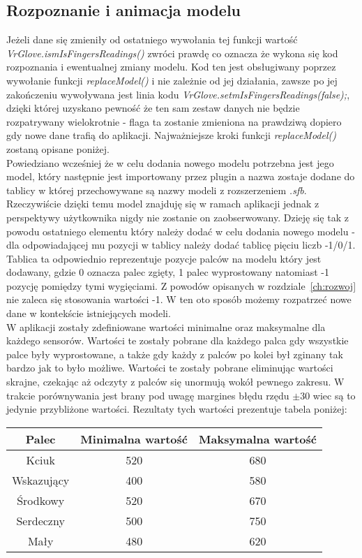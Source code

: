 	\subsection{Rozpoznanie i animacja modelu}
	\label{subsec:rozpoznanie}
	Jeżeli dane się zmieniły od ostatniego wywołania tej funkcji wartość \\  \textit{VrGlove.ismIsFingersReadings()} zwróci prawdę co oznacza że wykona się kod rozpoznania i ewentualnej zmiany modelu. Kod ten jest obsługiwany poprzez wywołanie funkcji \textit{replaceModel()} i nie zależnie od jej działania, zawsze po jej zakończeniu wywoływana jest linia kodu \textit{VrGlove.setmIsFingersReadings(false);}, dzięki której uzyskano pewność że ten sam zestaw danych nie będzie rozpatrywany wielokrotnie -  flaga ta zostanie zmieniona na prawdziwą dopiero gdy nowe dane trafią do aplikacji. Najważniejsze kroki funkcji \textit{replaceModel()} zostaną opisane poniżej. \\
	Powiedziano wcześniej że w celu dodania nowego modelu potrzebna jest jego model, który następnie jest importowany przez plugin a nazwa zostaje dodane do tablicy w której przechowywane są nazwy modeli z rozszerzeniem \textit{.sfb}. Rzeczywiście dzięki temu model znajduję się w ramach aplikacji jednak z perspektywy użytkownika nigdy nie zostanie on zaobserwowany. Dzieję się tak z powodu ostatniego elementu który należy dodać w celu dodania nowego modelu - dla odpowiadającej mu pozycji w tablicy należy dodać tablicę pięciu liczb -1/0/1. Tablica ta odpowiednio reprezentuje pozycje palców na modelu który jest dodawany, gdzie 0 oznacza palec zgięty, 1 palec wyprostowany natomiast -1 pozycję pomiędzy tymi wygięciami. Z powodów opisanych w rozdziale~\ref{ch:rozwoj} nie zaleca się stosowania wartości -1. W ten oto sposób możemy rozpatrzeć nowe dane w kontekście istniejących modeli. \\
	W aplikacji zostały zdefiniowane wartości minimalne oraz maksymalne dla każdego sensorów. Wartości te zostały pobrane dla każdego palca gdy wszystkie palce były wyprostowane, a także gdy każdy z palców po kolei był zginany tak bardzo jak to było możliwe. Wartości te zostały pobrane eliminując wartości skrajne, czekając aż odczyty z palców się unormują wokół pewnego zakresu. W trakcie porównywania jest brany pod uwagę margines błędu rzędu $\pm 30$ wiec są to jedynie przybliżone wartości. Rezultaty tych wartości prezentuje tabela poniżej:
\begin{center}
\begin{tabular}{|c|c|c|}
\hline
Palec & Minimalna wartość & Maksymalna wartość \\ \hline
Kciuk & 520 & 680\\ \hline
Wskazujący & 400 & 580\\ \hline
Środkowy & 520 & 670\\ \hline
Serdeczny & 500 & 750 \\ \hline
Mały & 480 & 620 \\ \hline
\hline
\end{tabular}
\end{center}
